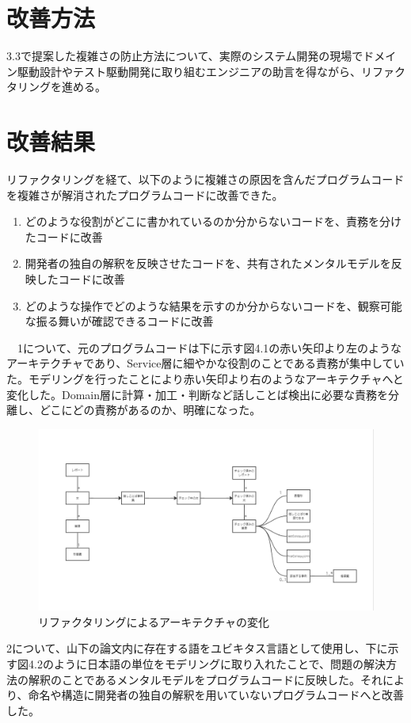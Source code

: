 \documentclass[12pt, a4paper]{jreport}
\begin{document}
\section{改善方法}
3.3で提案した複雑さの防止方法について、実際のシステム開発の現場でドメイン駆動設計やテスト駆動開発に取り組むエンジニアの助言を得ながら、リファクタリングを進める。
\section{改善結果}
リファクタリングを経て、以下のように複雑さの原因を含んだプログラムコードを複雑さが解消されたプログラムコードに改善できた。
\begin{enumerate}
\item どのような役割がどこに書かれているのか分からないコードを、責務を分けたコードに改善
\item 開発者の独自の解釈を反映させたコードを、共有されたメンタルモデルを反映したコードに改善
\item どのような操作でどのような結果を示すのか分からないコードを、観察可能な振る舞いが確認できるコードに改善
\end{enumerate}
　1について、元のプログラムコードは下に示す図4.1の赤い矢印より左のようなアーキテクチャであり、Service層に細やかな役割のことである責務が集中していた。モデリングを行ったことにより赤い矢印より右のようなアーキテクチャへと変化した。Domain層に計算・加工・判断など話しことば検出に必要な責務を分離し、どこにどの責務があるのか、明確になった。
\begin{figure}[H]
\centering
\includegraphics[width=1\linewidth]{image/kaizen2.png}
\caption{リファクタリングによるアーキテクチャの変化}
\label{fig:enter-label}
\end{figure}
2について、山下の論文内に存在する語をユビキタス言語として使用し、下に示す図4.2のように日本語の単位をモデリングに取り入れたことで、問題の解決方法の解釈のことであるメンタルモデルをプログラムコードに反映した。それにより、命名や構造に開発者の独自の解釈を用いていないプログラムコードへと改善した。
\end{document}
